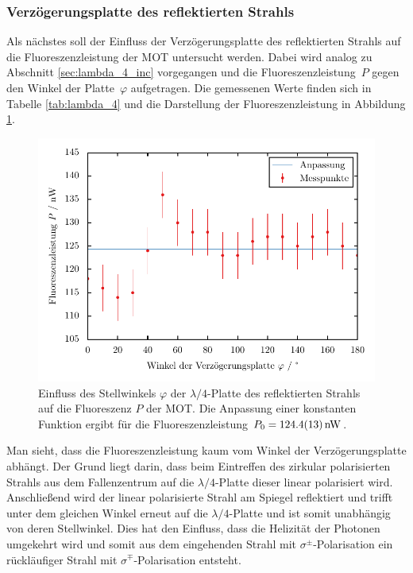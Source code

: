 \documentclass[11pt, a4paper]{article}
\numberwithin{equation}{section}
\begin{document}
\subsubsection{Verzögerungsplatte des reflektierten Strahls}
Als nächstes soll der Einfluss der Verzögerungsplatte des reflektierten Strahls auf die Fluoreszenzleistung der MOT untersucht werden.
Dabei wird analog zu Abschnitt \ref{sec:lambda_4_inc} vorgegangen und die Fluoreszenzleistung~$P$ gegen den Winkel der Platte~$\varphi$ aufgetragen.
Die gemessenen Werte finden sich in Tabelle \ref{tab:lambda_4} und die Darstellung der Fluoreszenzleistung in Abbildung \ref{fig:lambda_4_out}.
\begin{figure}[h]
	\centering
	\includegraphics{./figures/lambda_4_out.pdf}
	\caption{Einfluss des Stellwinkels $\varphi$ der $\lambda / 4$-Platte des reflektierten Strahls auf die Fluoreszenz $P$ der MOT. Die Anpassung einer konstanten Funktion ergibt für die Fluoreszenzleistung $P_0 = \SI{124.4 +- 1.3}{nW}$.}
	\label{fig:lambda_4_out}
\end{figure}

Man sieht, dass die Fluoreszenzleistung kaum vom Winkel der Verzögerungsplatte abhängt.
Der Grund liegt darin, dass beim Eintreffen des zirkular polarisierten Strahls aus dem Fallenzentrum auf die $\lambda / 4$-Platte dieser linear polarisiert wird.
Anschließend wird der linear polarisierte Strahl am Spiegel reflektiert und trifft unter dem gleichen Winkel erneut auf die $\lambda / 4$-Platte und ist somit unabhängig von deren Stellwinkel.
Dies hat den Einfluss, dass die Helizität der Photonen umgekehrt wird und somit aus dem eingehenden Strahl mit $\sigma^\pm$-Polarisation ein rückläufiger Strahl mit $\sigma^\mp$-Polarisation entsteht.
\end{document}
